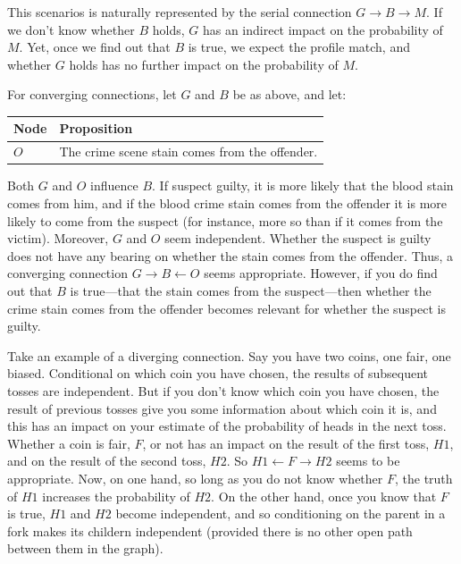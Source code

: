 \documentclass[
  10pt,
  dvipsnames,enabledeprecatedfontcommands]{scrartcl}
\begin{document}
\noindent This scenarios is naturally represented by the serial
connection \(G \rightarrow B \rightarrow M\). If we don't know whether
\(B\) holds, \(G\) has an indirect impact on the probability of \(M\).
Yet, once we find out that \(B\) is true, we expect the profile match,
and whether \(G\) holds has no further impact on the probability of
\(M\).

For converging connections, let \(G\) and \(B\) be as above, and let:

\begin{center}
\begin{tabular}{@{}lp{6.3cm}@{}}\toprule
Node & Proposition \\ \midrule 
$O$ & The crime scene stain comes from the offender.\\
\bottomrule
\end{tabular}
\end{center}
\normalsize

\noindent Both \(G\) and \(O\) influence \(B\). If suspect guilty, it is
more likely that the blood stain comes from him, and if the blood crime
stain comes from the offender it is more likely to come from the suspect
(for instance, more so than if it comes from the victim). Moreover,
\(G\) and \(O\) seem independent. Whether the suspect is guilty does not
have any bearing on whether the stain comes from the offender. Thus, a
converging connection \(G\rightarrow B \leftarrow O\) seems appropriate.
However, if you do find out that \(B\) is true---that the stain comes
from the suspect---then whether the crime stain comes from the offender
becomes relevant for whether the suspect is guilty.

Take an example of a diverging connection. Say you have two coins, one
fair, one biased. Conditional on which coin you have chosen, the results
of subsequent tosses are independent. But if you don't know which coin
you have chosen, the result of previous tosses give you some information
about which coin it is, and this has an impact on your estimate of the
probability of heads in the next toss. Whether a coin is fair, \(F\), or
not has an impact on the result of the first toss, \(H1\), and on the
result of the second toss, \(H2\). So \(H1 \leftarrow F \rightarrow H2\)
seems to be appropriate. Now, on one hand, so long as you do not know
whether \(F\), the truth of \(H1\) increases the probability of \(H2\).
On the other hand, once you know that \(F\) is true, \(H1\) and \(H2\)
become independent, and so conditioning on the parent in a fork makes
its childern independent (provided there is no other open path between
them in the graph).
\end{document}
